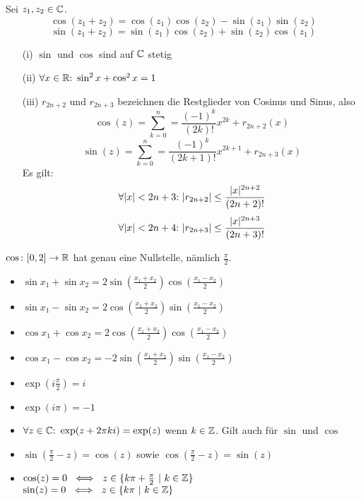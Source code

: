 \begin{framedthm}[Additionstheoreme]
	Sei $z_1,z_2 \in \mathbb{C}$.
	\[
	\cos(z_1 + z_2) = \cos(z_1)\cos(z_2) - \sin(z_1)\sin(z_2)
	\]
	\[
	\sin(z_1 + z_2) = \sin(z_1)\cos(z_2) + \sin(z_2)\cos(z_1)
	\]
\end{framedthm}

\begin{framedthm}
	\begin{enumerate}
		\item [(i)] $\sin$ und $\cos$ sind auf $\mathbb{C}$ stetig
		\item [(ii)] $\forall x \in \mathbb{R}{:}\  \sin^2 x + \cos^2 x = 1$
		\item [(iii)] $r_{2n+2}$ und $r_{2n+3}$ bezeichnen die Restglieder von Cosinus und Sinus, also 
		\[
		\cos(z) = \sum_{k=0}^{n} = \frac{(-1)^k}{(2k)!} x^{2k} + r_{2n+2}(x)
		\]
		\[
		\sin(z) = \sum_{k=0}^{n} = \frac{(-1)^k}{(2k + 1)!} x^{2k + 1} + r_{2n+3}(x)
		\]
		Es gilt:
		\[
		\forall |x| < 2n+3{:}\  |r_{2n+2}| \leq \frac{|x|^{2n+2}}{(2n+2)!}
		\]
		\[
		\forall |x| < 2n+4{:}\  |r_{2n+3}| \leq \frac{|x|^{2n+3}}{(2n+3)!}
		\]
	\end{enumerate}
\end{framedthm}

\begin{framedthm}
	$\cos{:}\  [0,2] \to \mathbb{R}$ hat genau eine Nullstelle, nämlich $\frac{\pi}{2}$.
\end{framedthm}

\begin{framedthm}
	\begin{itemize}
		\item $\sin x_1 + \sin x_2 = 2 \sin(\frac{x_1 + x_2}{2}) \cos(\frac{x_1 - x_2}{2})$
		\item $\sin x_1 - \sin x_2 = 2 \cos(\frac{x_1 + x_2}{2}) \sin(\frac{x_1 - x_2}{2})$
		\item $\cos x_1 + \cos x_2 = 2 \cos(\frac{x_1 + x_2}{2}) \cos(\frac{x_1 - x_2}{2})$
		\item $\cos x_1 - \cos x_2 = -2 \sin(\frac{x_1 + x_2}{2}) \sin(\frac{x_1 - x_2}{2})$
	\end{itemize}
\end{framedthm}

\begin{framedquest}
	\begin{itemize}
		\item $\exp(i\frac{\pi}{2}) = i$
		\item $\exp(i\pi) = -1$
		\item $\forall z \in \mathbb{C}{:}\  \exp(z + 2\pi k i) = \exp(z)$ wenn $k \in \mathbb{Z}$. Gilt auch für $\sin$ und $\cos$
		\item $\sin(\frac{\pi}{2} - z) = \cos(z)$ sowie $\cos(\frac{\pi}{2} - z) = \sin(z)$
		\item $\cos(z) = 0 \ \iff\ z \in \{k\pi + \frac{\pi}{2} \ |\ k \in \mathbb{Z}\}$\\ $\sin(z) = 0 \ \iff\ z \in \{k\pi \ |\ k \in \mathbb{Z}\}$
	\end{itemize}
\end{framedquest}

